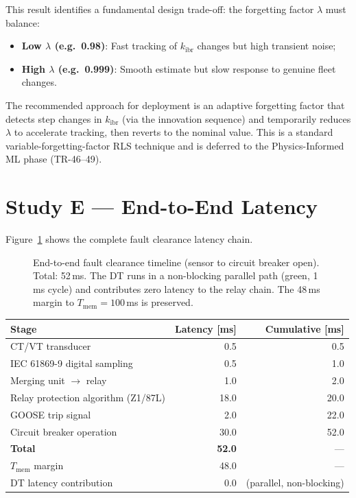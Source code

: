 \documentclass[11pt,a4paper]{article}
\begin{document}
This result identifies a fundamental design trade-off: the forgetting factor
$\lambda$ must balance:
\begin{itemize}
  \item \textbf{Low $\lambda$ (e.g.\ 0.98)}: Fast tracking of $k_\mathrm{ibr}$
    changes but high transient noise;
  \item \textbf{High $\lambda$ (e.g.\ 0.999)}: Smooth estimate but slow response
    to genuine fleet changes.
\end{itemize}

The recommended approach for deployment is an adaptive forgetting factor that
detects step changes in $k_\mathrm{ibr}$ (via the innovation sequence) and
temporarily reduces $\lambda$ to accelerate tracking, then reverts to the
nominal value.  This is a standard variable-forgetting-factor RLS technique
\cite{SAMBP_TR44} and is deferred to the Physics-Informed ML phase (TR-46--49).

\section{Study E --- End-to-End Latency}
\label{sec:studyE}

Figure~\ref{fig:latency} shows the complete fault clearance latency chain.

\begin{figure}[htbp]
  \centering
  \resizebox{0.96\textwidth}{!}{}
  \caption{End-to-end fault clearance timeline (sensor to circuit breaker
           open).  Total: 52\,ms.  The DT runs in a non-blocking parallel
           path (green, 1\,ms cycle) and contributes zero latency to the
           relay chain.  The 48\,ms margin to $T_\mathrm{mem}=100$\,ms is
           preserved.}
  \label{fig:latency}
\end{figure}

\begin{center}
\begin{tabular}{@{}lrr@{}}
\toprule
Stage & Latency [ms] & Cumulative [ms] \\
\midrule
CT/VT transducer & 0.5 & 0.5 \\
IEC 61869-9 digital sampling & 0.5 & 1.0 \\
Merging unit $\to$ relay & 1.0 & 2.0 \\
Relay protection algorithm (Z1/87L) & 18.0 & 20.0 \\
GOOSE trip signal & 2.0 & 22.0 \\
Circuit breaker operation & 30.0 & 52.0 \\
\midrule
\textbf{Total} & \textbf{52.0} & --- \\
$T_\mathrm{mem}$ margin & 48.0 & --- \\
DT latency contribution & 0.0 & (parallel, non-blocking) \\
\bottomrule
\end{tabular}
\end{center}
\end{document}

